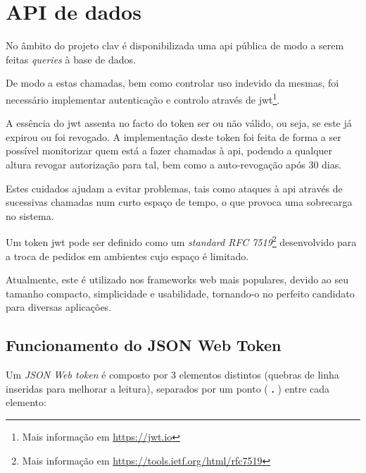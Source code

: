 \cleardoublepage
\section{API de dados}

No âmbito do projeto \gls{clav} é disponibilizada uma \gls{api} pública de modo a serem feitas \emph{queries} à base de dados.

De modo a estas chamadas, bem como controlar uso indevido da mesmas, foi necessário implementar autenticação e controlo através de \gls{jwt}\footnote{Mais informação em \url{https://jwt.io}}.

A essência do \gls{jwt} assenta no facto do token ser ou não válido, ou seja, se este já expirou ou foi revogado. A implementação deste token foi feita de forma a ser possível monitorizar quem está a fazer chamadas à \gls{api}, podendo a qualquer altura revogar autorização para tal, bem como a auto-revogação após 30 dias.

Estes cuidados ajudam a evitar problemas, tais como ataques à \gls{api} através de sucessivas chamadas num curto espaço de tempo, o que provoca uma sobrecarga no sistema.



Um token \gls{jwt} pode ser definido como um \emph{standard RFC 7519}\cite{jones2015json}\cite{peyrott2016jwt}\footnote{Mais informação em \url{https://tools.ietf.org/html/rfc7519}} desenvolvido para a troca de pedidos em ambientes cujo espaço é limitado. 

Atualmente, este é utilizado nos frameworks web mais populares, devido ao seu tamanho compacto, simplicidade e usabilidade, tornando-o no perfeito candidato para diversas aplicações.

\subsection{Funcionamento do JSON Web Token}

Um \emph{JSON Web token} é composto por 3 elementos distintos (quebras de linha inseridas para melhorar a leitura), separados por um ponto (\textbf{ . }) entre cada elemento:

